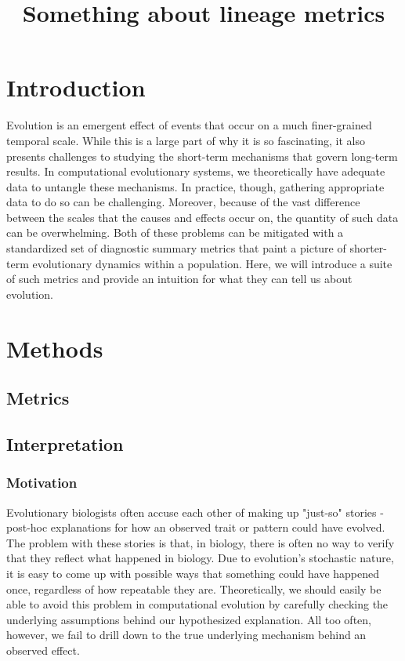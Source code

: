 \documentclass[letterpaper]{article}
\title{Something about lineage metrics}
\begin{document}
\maketitle

\begin{abstract}

\end{abstract}

\section{Introduction}

Evolution is an emergent effect of events that occur on a much finer-grained temporal scale. While this is a large part of why it is so fascinating, it also presents challenges to studying the short-term mechanisms that govern long-term results. In computational evolutionary systems, we theoretically have adequate data to untangle these mechanisms. In practice, though, gathering appropriate data to do so can be challenging. Moreover, because of the vast difference between the scales that the causes and effects occur on, the quantity of such data can be overwhelming. Both of these problems can be mitigated with a standardized set of diagnostic summary metrics that paint a picture of shorter-term evolutionary dynamics within a population. Here, we will introduce a suite of such metrics and provide an intuition for what they can tell us about evolution.

\section{Methods}

\subsection{Metrics}

\subsection{Interpretation}

\subsubsection{Motivation}
Evolutionary biologists often accuse each other of making up "just-so" stories - post-hoc explanations for how an observed trait or pattern could have evolved. The problem with these stories is that, in biology, there is often no way to verify that they reflect what happened in biology. Due to evolution's stochastic nature, it is easy to come up with possible ways that something could have happened once, regardless of how repeatable they are. Theoretically, we should easily be able to avoid this problem in computational evolution by carefully checking the underlying assumptions behind our hypothesized explanation.  All too often, however, we fail to drill down to the true underlying mechanism behind an observed effect.
\end{document}
